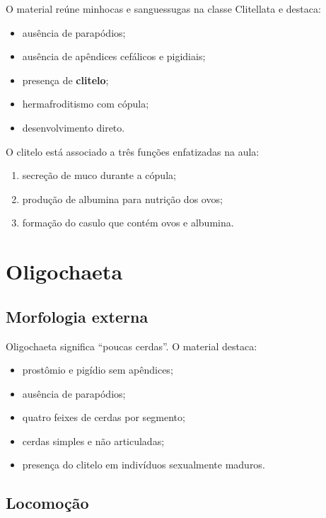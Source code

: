 \documentclass[a4paper,12pt]{article}
\newcommand{\termo}[1]{\textbf{#1}}
\begin{document}
O material reúne minhocas e sanguessugas na classe Clitellata e destaca:

\begin{itemize}
  \item ausência de parapódios;
  \item ausência de apêndices cefálicos e pigidiais;
  \item presença de \termo{clitelo};
  \item hermafroditismo com cópula;
  \item desenvolvimento direto.
\end{itemize}

O clitelo está associado a três funções enfatizadas na aula:

\begin{enumerate}
  \item secreção de muco durante a cópula;
  \item produção de albumina para nutrição dos ovos;
  \item formação do casulo que contém ovos e albumina.
\end{enumerate}

\section{Oligochaeta}

\subsection{Morfologia externa}

Oligochaeta significa ``poucas cerdas''. O material destaca:

\begin{itemize}
  \item prostômio e pigídio sem apêndices;
  \item ausência de parapódios;
  \item quatro feixes de cerdas por segmento;
  \item cerdas simples e não articuladas;
  \item presença do clitelo em indivíduos sexualmente maduros.
\end{itemize}

\subsection{Locomoção}
\end{document}
